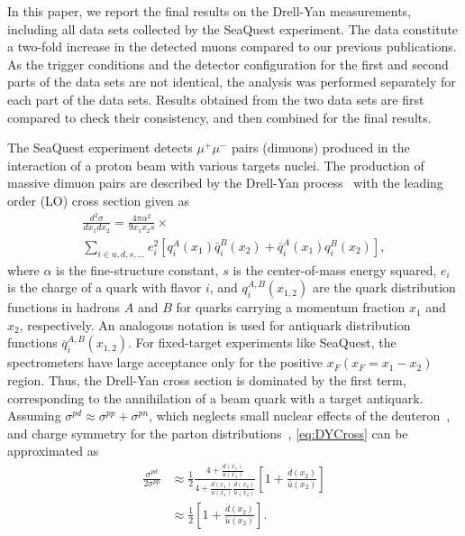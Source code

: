 \documentclass[reprint,aps,unsortedaddress,superscriptaddress,prl,floatfix,showpacs,linenumbers]{revtex4-2}
\begin{document}
In this paper, we report the final results on the Drell-Yan measurements,
including all data sets collected by the SeaQuest experiment.
The data constitute a two-fold increase in the detected muons compared
to our previous publications. As the trigger
conditions and the detector configuration for the first and second parts
of the data sets are not
identical, the analysis was performed separately for each part of the
data sets.
Results obtained from the two data sets are first compared to check their
consistency, and then combined for the final results.

The SeaQuest experiment detects $\mu^+\mu^-$ pairs (dimuons) produced in
the interaction of a proton beam with various targets nuclei. The production
of massive dimuon pairs are described by the Drell-Yan
process~\cite{drell1970} with the leading order (LO) cross section given as
\begin{multline}
	\frac{d^2\sigma}{dx_1dx_2}=\frac{4\pi \alpha^2}{9x_1x_2s} \times
	\label{eq:DYCross} \\
	\sum_{i\in u,d,s,\dots} e_i^2 \left[q_i^A\left(x_1\right) \bar q_i^B\left(x_2\right) + \bar q_i^A\left(x_1\right)
		q_i^B\left(x_2\right)\right],
\end{multline}
where $\alpha$ is the fine-structure constant, 
$s$ is the center-of-mass energy squared,
$e_i$ is the charge of a quark
with flavor $i$, and $q_i^{A,B}\left(x_{1,2}\right)$ are the quark
distribution functions in hadrons $A$ and $B$
for quarks carrying a momentum fraction $x_1$ and $x_2$, respectively.
An analogous notation is used for antiquark distribution functions
$\bar q_i^{A,B}\left(x_{1,2}\right)$.
For fixed-target experiments like SeaQuest, the spectrometers have
large acceptance only for the positive $x_F (x_F = x_1 - x_2)$ region. %
Thus, the Drell-Yan cross section is dominated by
the first term, corresponding to the annihilation of a beam quark with
a target antiquark. Assuming
$\sigma^{pd} \approx \sigma^{pp} + \sigma^{pn}$,
which neglects small nuclear effects of the
deuteron~\cite{kumano1998,ehlers2014},
and charge symmetry for the parton distributions~\cite{londergan2010},
\cref{eq:DYCross} can be approximated as
\begin{equation}
	\begin{split}
		\frac{\sigma^{pd}}{2\sigma^{pp}} & \approx
		\frac{1}{2} \frac{4+\frac{d\left(x_1\right)}
			{u\left(x_1\right)}}{4+\frac{d\left(x_1\right)}
			{u\left(x_1\right)}\frac{\bar d\left(x_2\right)}{\bar u\left(x_2\right)}}
		\left[1+\frac{\bar d\left(x_2\right)}{\bar u\left(x_2\right)}\right]                         \\
		                                 & \approx \frac{1}{2} \left[1+\frac{\bar d\left(x_2\right)}
			{\bar u\left(x_2\right)}\right].
	\end{split}
	\label{eq:crRatio}
\end{equation}
\end{document}
